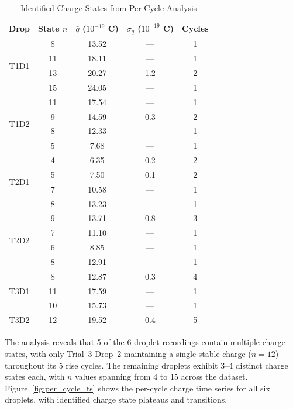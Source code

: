 \documentclass[11pt]{article}
\begin{document}
\begin{table}[h!]
    \centering
    \caption{Identified Charge States from Per-Cycle Analysis}
    \vspace{0.1in}
    \begin{tabular}{|c|c|c|c|c|}
    \hline
    \textbf{Drop} & \textbf{State $n$} & \textbf{$\bar{q}$ ($10^{-19}$ C)} & \textbf{$\sigma_q$ ($10^{-19}$ C)} & \textbf{Cycles} \\
    \hline
    \multirow{4}{*}{T1D1} & 8 & 13.52 & --- & 1 \\
     & 11 & 18.11 & --- & 1 \\
     & 13 & 20.27 & 1.2 & 2 \\
     & 15 & 24.05 & --- & 1 \\
    \hline
    \multirow{4}{*}{T1D2} & 11 & 17.54 & --- & 1 \\
     & 9 & 14.59 & 0.3 & 2 \\
     & 8 & 12.33 & --- & 1 \\
     & 5 & 7.68 & --- & 1 \\
    \hline
    \multirow{4}{*}{T2D1} & 4 & 6.35 & 0.2 & 2 \\
     & 5 & 7.50 & 0.1 & 2 \\
     & 7 & 10.58 & --- & 1 \\
     & 8 & 13.23 & --- & 1 \\
    \hline
    \multirow{4}{*}{T2D2} & 9 & 13.71 & 0.8 & 3 \\
     & 7 & 11.10 & --- & 1 \\
     & 6 & 8.85 & --- & 1 \\
     & 8 & 12.91 & --- & 1 \\
    \hline
    \multirow{3}{*}{T3D1} & 8 & 12.87 & 0.3 & 4 \\
     & 11 & 17.59 & --- & 1 \\
     & 10 & 15.73 & --- & 1 \\
    \hline
    T3D2 & 12 & 19.52 & 0.4 & 5 \\
    \hline
    \end{tabular}
\end{table}

The analysis reveals that 5 of the 6 droplet recordings contain multiple charge states, with only Trial~3 Drop~2 maintaining a single stable charge ($n = 12$) throughout its 5 rise cycles. The remaining droplets exhibit 3--4 distinct charge states each, with $n$ values spanning from 4 to 15 across the dataset. Figure~\ref{fig:per_cycle_ts} shows the per-cycle charge time series for all six droplets, with identified charge state plateaus and transitions.
\end{document}
